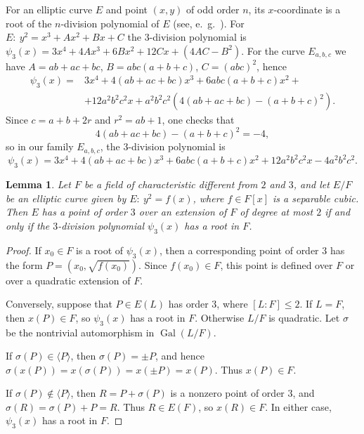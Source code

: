 \documentclass{article}
\theoremstyle{plain}
\newtheorem{lemma}[theorem]{Lemma}
\begin{document}
For an elliptic curve \(E\) and point \((x, y)\) of odd order \(n\), its \(x\)-coordinate is a root of the \(n\)-division polynomial of \(E\) (see, e.~g.~\cite[§13.9]{Husemoller2004}). For
\( E:\ y^2=x^3+Ax^2+Bx+C \)
the \(3\)-division polynomial is
\(
\psi_3(x)=3x^4+4Ax^3+6Bx^2+12Cx+(4AC-B^2).
\)
For the curve \(E_{a,b,c}\) we have
\( A=ab+ac+bc \), \( B=abc(a+b+c) \), \( C=(abc)^2 \),
hence
\begin{align*}
\psi_3(x)
=
& 3x^4
+4(ab+ac+bc)x^3
+6abc(a+b+c)x^2+\\
&+12a^2b^2c^2x
+a^2b^2c^2\left(4(ab+ac+bc)-(a+b+c)^2\right).
\end{align*}
Since \(c=a+b+2r\) and \(r^2=ab+1\), one checks that
\[
4(ab+ac+bc)-(a+b+c)^2=-4,
\]
so in our family \(E_{a,b,c}\), the \(3\)-division polynomial is
\begin{equation}\label{eq:psi3-family}
\psi_3(x)
=
3x^4
+4(ab+ac+bc)x^3
+6abc(a+b+c)x^2
+12a^2b^2c^2x
-4a^2b^2c^2.
\end{equation}

\begin{lemma}\label{lem:quadratic-3torsion-psi3}
Let \(F\) be a field of characteristic different from \(2\) and \(3\), and let
\(E/F\) be an elliptic curve given by \( E:\ y^2=f(x)\),
where \(f\in F[x]\) is a separable cubic. Then \(E\) has a point of order \(3\)
over an extension of \(F\) of degree at most \(2\) if and only if the
\(3\)-division polynomial \(\psi_3(x)\) has a root in \(F\).
\end{lemma}

\begin{proof}
If \(x_0\in F\) is a root of \(\psi_3(x)\), then a corresponding point of order
\(3\) has the form
\( P=(x_0,\sqrt{f(x_0)}) \).
Since \(f(x_0)\in F\), this point is defined over \(F\) or over a quadratic extension of \(F\).

Conversely, suppose that \(P\in E(L)\) has order \(3\), where \([L:F]\leqslant 2\).
If \(L=F\), then \(x(P)\in F\), so \(\psi_3(x)\) has a root in \(F\). Otherwise \(L/F\) is quadratic. Let \(\sigma\) be the nontrivial automorphism in \(\operatorname{Gal}(L/F)\).

If \(\sigma(P)\in\langle P\rangle\), then
\(\sigma(P)=\pm P\), and hence
\(
\sigma(x(P))=x(\sigma(P))=x(\pm P)=x(P)\). Thus \(x(P)\in F\).

If \(\sigma(P)\notin\langle P\rangle\), then
\(
R=P+\sigma(P)
\)
is a nonzero point of order \(3\), and
\(\sigma(R)=\sigma(P)+P=R\).
Thus \(R\in E(F)\), so \(x(R)\in F\). In either case, \(\psi_3(x)\) has a root in \(F\).
\end{proof}
\end{document}
